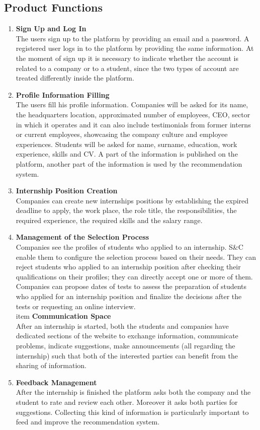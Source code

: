 \subsection{Product Functions}
\begin{enumerate}
    \item \textbf {Sign Up and Log In}
    \\ The users sign up to the platform by providing an email and a password. A registered user logs in to the platform by providing the same information. At the moment of sign up it is necessary to indicate whether the account is related to a company or to a student, since the two types of account are treated differently inside the platform.
    \item \textbf {Profile Information Filling}
    \\ The users fill his profile information. Companies will be asked for its name, the headquarters location, approximated number of employees, CEO, sector in which it operates and it can also include testimonials from former interns or current employees, showcasing the company culture and employee experiences. Students will be asked for name, surname, education, work experience, skills and CV. A part of the information is published on the platform, another part of the information is used by the recommendation system.
    \item \textbf {Internship Position Creation}
    \\ Companies can create new internships positions by establishing the expired deadline to apply, the work place, the role title, the responsibilities, the required experience, the required skills and the salary range.
    \item \textbf {Management of the Selection Process}
    \\ Companies see the profiles of students who applied to an internship. S\&C enable them to configure the selection process based on their needs. They can reject students who applied to an internship position after checking their qualifications on their profiles; they can directly accept one or more of them. Companies can propose dates of tests to assess the preparation of students who applied for an internship position and finalize the decisions after the tests or requesting an online interview.
    \\item \textbf {Communication Space}
    \\ After an internship is started, both the students and companies have dedicated sections of the website to exchange information, communicate problems, indicate suggestions, make announcements (all regarding the internship) such that both of the interested parties can benefit from the sharing of information. 
    \item \textbf {Feedback Management}
    \\ After the internship is finished the platform asks both the company and the student to rate and review each other. Moreover it asks both parties for suggestions. Collecting this kind of information is particularly important to feed and improve the recommendation system.
     

\end{enumerate}

